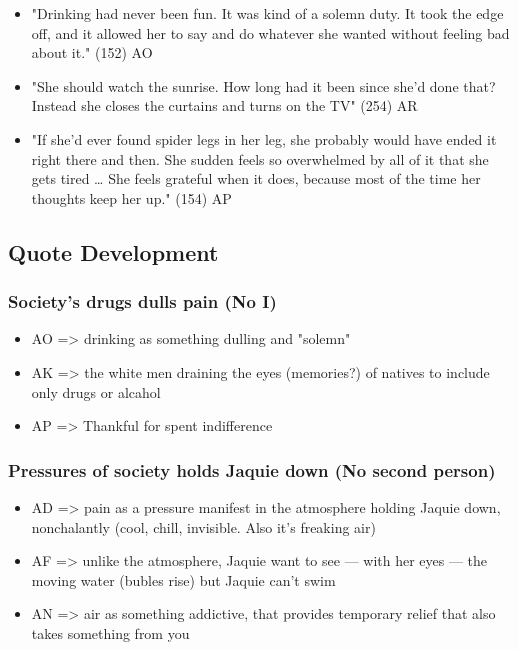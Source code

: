 \documentclass[letterpaper]{article}
\begin{document}
\begin{itemize}
\item "Drinking had never been fun. It was kind of a solemn duty. It took the edge off, and it allowed her to say and do whatever she wanted without feeling bad about it." (152) AO
\item "She should watch the sunrise. How long had it been since she'd done that? Instead she closes the curtains and turns on the TV" (254) AR
\item "If she'd ever found spider legs in her leg, she probably would have ended it right there and then. She sudden feels so overwhelmed by all of it that she gets tired \ldots{} She feels grateful when it does, because most of the time her thoughts keep her up." (154) AP
\end{itemize}

\subsection{Quote Development}
\label{sec:org1926574}

\subsubsection{Society's drugs dulls pain (No I)}
\label{sec:orgbd7fe48}
\begin{itemize}
\item AO => drinking as something dulling and "solemn"
\end{itemize}

\begin{itemize}
\item AK => the white men draining the eyes (memories?) of natives to include only drugs or alcahol
\item AP => Thankful for spent indifference
\end{itemize}

\subsubsection{Pressures of society holds Jaquie down (No second person)}
\label{sec:org62df44e}
\begin{itemize}
\item AD => pain as a pressure manifest in the atmosphere holding Jaquie down, nonchalantly (cool, chill, invisible. Also it's freaking air)
\item AF => unlike the atmosphere, Jaquie want to see --- with her eyes --- the moving water (bubles rise) but Jaquie can't swim
\item AN => air as something addictive, that provides temporary relief that also takes something from you
\end{itemize}
\end{document}
